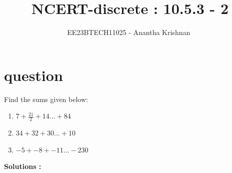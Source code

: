 \documentclass[journal,12pt,onecolumn]{IEEEtran}
\theoremstyle{remark}
\begin{document}

\vspace{3cm}

\title{NCERT-discrete : 10.5.3 - 2}
\author{EE23BTECH11025 - Anantha Krishnan $^{}$%
}
\maketitle
\bigskip



\section{question}

Find the sums given below:
\begin{enumerate}
    \item  $7 + \frac{21}{2} + 14 ... + 84$
    \item  $34 + 32 + 30 ... + 10$
    \item  $-5 + -8 + -11 ... -230$
\end{enumerate}

 



\textbf{Solutions :}
\end{document}
